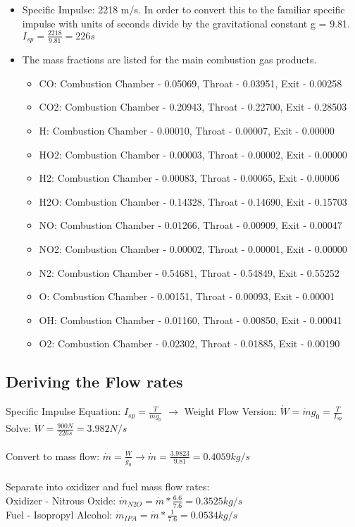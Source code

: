 \documentclass[12pt, letter paper]{article}
\begin{document}
\begin{enumerate}
\begin{itemize}
							\item Specific Impulse: 2218 m/s. In order to convert this to the familiar specific impulse with units of seconds divide by the gravitational constant g = 9.81. $ I_{sp} = \frac{2218}{9.81} = 226 s $
							\item The mass fractions are listed for the main combustion gas products.
							\begin{itemize}
								\item CO: Combustion Chamber - 0.05069, Throat -  0.03951, Exit - 0.00258
								\item CO2: Combustion Chamber - 0.20943, Throat - 0.22700, Exit - 0.28503
								\item H: Combustion Chamber - 0.00010, Throat -  0.00007, Exit - 0.00000
								\item HO2: Combustion Chamber - 0.00003, Throat - 0.00002, Exit - 0.00000
								\item H2: Combustion Chamber - 0.00083, Throat - 0.00065, Exit - 0.00006
								\item H2O: Combustion Chamber - 0.14328, Throat - 0.14690, Exit - 0.15703
								\item NO: Combustion Chamber - 0.01266, Throat - 0.00909, Exit - 0.00047
								\item NO2: Combustion Chamber - 0.00002, Throat - 0.00001, Exit - 0.00000
								\item N2: Combustion Chamber - 0.54681, Throat - 0.54849, Exit - 0.55252
								\item O: Combustion Chamber - 0.00151, Throat - 0.00093, Exit - 0.00001
								\item OH: Combustion Chamber - 0.01160, Throat - 0.00850, Exit - 0.00041
								\item O2: Combustion Chamber - 0.02302, Throat -  0.01885, Exit - 0.00190
							\end{itemize}
						\end{itemize}
				\end{enumerate}
			
		\subsection{Deriving the Flow rates}
			Specific Impulse Equation:  $I_{sp} = \frac{T}{\dot{m} g_0} $ 
			$\rightarrow$
			Weight Flow Version: $ \dot{W} = \dot{m} g_0= \frac{T}{I_{sp}}$ \\
			Solve: $ \dot{W} = \frac{900 N}{226 s} = 3.982 N/s $ \\ \\
			Convert to mass flow: $ \dot{m} = \frac{\dot{W}}{g_0} \rightarrow \dot{m} = \frac{3.9823}{9.81} = 0.4059 kg/s $ \\ \\
			Separate into oxidizer and fuel mass flow rates: \\
			Oxidizer - Nitrous Oxide: $ \dot{m}_{N2O} = \dot{m} * \frac{6.6}{7.6} = 0.3525 kg/s $ \\
			Fuel - Isopropyl Alcohol: $ \dot{m}_{IPA} = \dot{m}*\frac{1}{7.6} = 0.0534 kg/s $ \\
	
\end{document}
